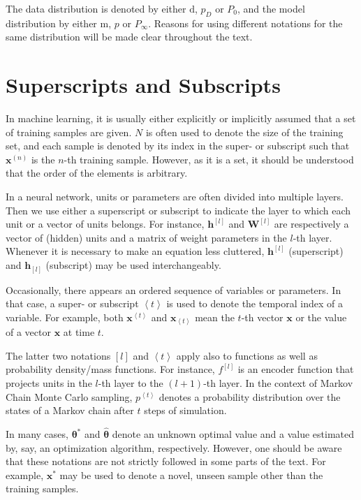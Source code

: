 \documentclass{now}
\newcommand{\qt}[1]{\left<#1\right>}
\newcommand{\qlay}[1]{\left[#1\right]}
\newcommand{\vect}[1]{\mathbf{#1}}
\newcommand{\vects}[1]{\boldsymbol{#1}}
\newcommand{\matr}[1]{\mathbf{#1}}
\newcommand{\vh}[0]{\vect{h}}
\newcommand{\vx}[0]{\vect{x}}
\newcommand{\mW}[0]{\matr{W}}
\newcommand{\td}[0]{\text{d}}
\newcommand{\tf}[0]{\text{m}}
\newcommand{\TT}[0]{{\vects{\theta}}}
\begin{document}
The data distribution is denoted by either $\td$, $p_D$ or $P_0$, and the model
distribution by either $\tf$, $p$ or $P_\infty$.  Reasons for using different
notations for the same distribution will be made clear throughout the text.


\section*{Superscripts and Subscripts}

In machine learning, it is usually either explicitly or implicitly assumed that
a set of training samples are given. $N$ is often used to denote the size of
the training set, and each sample is denoted by its index in the super- or
subscript such that $\vx^{(n)}$ is the $n$-th training sample. However, as it
is a set, it should be understood that the order of the elements is
arbitrary.

In a neural network, units or parameters are often divided into multiple
layers. Then we use either a superscript or subscript to indicate the layer to
which each unit or a vector of units belongs. For instance, $\vh^{\qlay{l}}$
and $\mW^{\qlay{l}}$ are respectively a vector of (hidden) units and a matrix
of weight parameters in the $l$-th layer.  Whenever it is necessary to make an
equation less cluttered, $\vh^{\qlay{l}}$ (superscript) and $\vh_{\qlay{l}}$
(subscript) may be used interchangeably.

Occasionally, there appears an ordered sequence of variables or parameters. In
that case, a super- or subscript $\qt{t}$ is used to denote the temporal index
of a variable.  For example, both $\vx^{\qt{t}}$ and $\vx_{\qt{t}}$ mean the
$t$-th vector $\vx$ or the value of a vector $\vx$ at time $t$.

The latter two notations $\qlay{l}$ and $\qt{t}$ apply also to functions as
well as probability density/mass functions.  For instance, $f^{\qlay{l}}$ is an
encoder function that projects units in the $l$-th layer to the $(l+1)$-th
layer.  In the context of Markov Chain Monte Carlo sampling, $p^{\qt{t}}$
denotes a probability distribution over the states of a Markov chain after $t$
steps of simulation.

In many cases, $\TT^*$ and $\hat{\TT}$ denote an unknown optimal value and a
value estimated by, say, an optimization algorithm, respectively. However, one
should be aware that these notations are not strictly followed in some parts of
the text. For example, $\vx^*$ may be used to denote a novel, unseen sample
other than the training samples.
\end{document}
